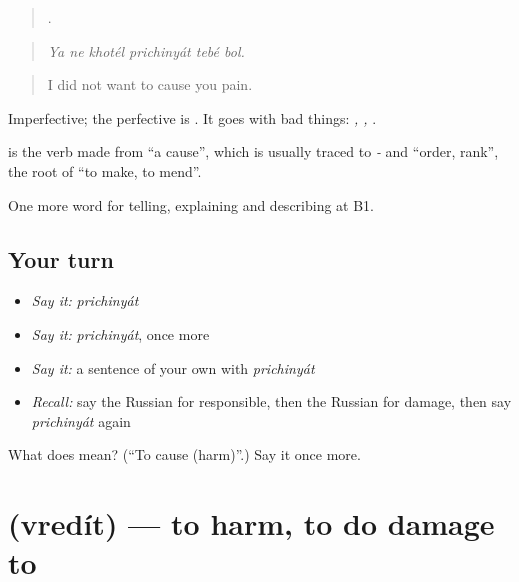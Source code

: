 \begin{quote}
     .
\end{quote}

\begin{quote}
\emph{Ya ne khotél prichinyát tebé bol.}
\end{quote}

\begin{quote}
I did not want to cause you pain.
\end{quote}

Imperfective; the perfective is \emph{}. It goes with bad things: \emph{ , , }.

\begin{cousinweb}
\textbf{} is the verb made from \emph{} \textquotedblleft{}a cause\textquotedblright{}, which is usually traced to \emph{-} and \emph{} \textquotedblleft{}order, rank\textquotedblright{}, the root of \emph{} \textquotedblleft{}to make, to mend\textquotedblright{}.
\end{cousinweb}

\begin{grammarlens}[title={What you've built}]
One more word for telling, explaining and describing at B1.
\end{grammarlens}

\subsection*{Your turn}
\begin{itemize}
\raggedright
  \item \emph{Say it:} \emph{prichinyát}
  \item \emph{Say it:} \emph{prichinyát}, once more
  \item \emph{Say it:} a sentence of your own with \emph{prichinyát}
  \item \emph{Recall:} say the Russian for responsible, then the Russian for damage, then say \emph{prichinyát} again
\end{itemize}

\begin{tcolorbox}[breakable,colback=teal!4,colframe=teal!35!black,title={Before you move on}]
What does  mean? (\textquotedblleft{}To cause (harm)\textquotedblright{}.) Say it once more.
\end{tcolorbox}
\section[\texorpdfstring{\ru{вредить} (vredít)}{вредить (vredít)}]{ (vredít) — to harm, to do damage to}

